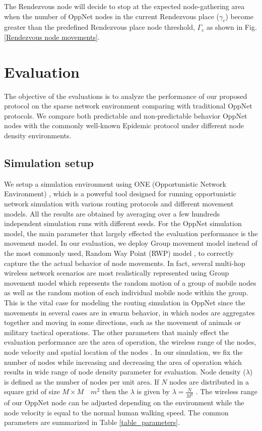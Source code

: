 \documentclass[conference]{IEEEtran}
\begin{document}
The Rendezvous node will decide to stop at the expected node-gathering area when the number of OppNet nodes in the current Rendezvous place ($\gamma_{c}$) become greater than the predefined Rendezvous place node threshold, $\Gamma_{c}$ as shown in Fig. \ref{Rendezvous node movements}.  

\section{Evaluation}
The objective of the evaluations is to analyze the performance of our proposed protocol on the sparse network environment comparing with traditional OppNet protocols.
We compare both predictable and non-predictable behavior OppNet nodes with the commonly well-known Epidemic protocol\cite{Vahdat2000} under different node density environments.

\subsection{Simulation setup}
We setup a simulation environment using ONE (Opportunistic Network Environment) \cite{Keranen2009b}, which is a powerful tool designed for running opportunistic network simulation with various routing protocols and different movement models.
All the results are obtained by averaging over a few hundreds independent simulation runs with different seeds.
For the OppNet simulation model, the main parameter that largely effected the evaluation performance is the movement model.
In our evaluation, we deploy Group movement model instead of the most commonly used, Random Way Point (RWP) model \cite{Batabyal2012}, to correctly capture the the actual behavior of node movements.
In fact, several multi-hop wireless network scenarios are most realistically represented using Group movement model \cite{Blakely2004} which represents the random motion of a group of mobile nodes as well as the random motion of each individual mobile node within the group.
This is the vital case for modeling the routing simulation in OppNet since the movements in several cases are in swarm behavior, in which nodes are aggregates together and moving in some directions, such as the movement of animals or military tactical operations.
The other parameters that mainly effect the evaluation performance are the area of operation, the wireless range of the nodes, node velocity and spatial location of the nodes \cite{Batabyal2012}. 
In our simulation, we fix the number of nodes while increasing and decreasing the area of operation which results in wide range of node density parameter for evaluation.
Node density ($\lambda$) is defined as the number of nodes per unit area. 
If $N$ nodes are distributed in a square grid of size $M \times M \quad{ m }^{ 2 }$ then the $\lambda$ is given by $\lambda =\frac { N }{ { M }^{ 2 } } $ . 
The wireless range of our OppNet node can be adjusted depending on the environment while the node velocity is equal to the normal human walking speed.
The common parameters are summarized in Table \ref{table_parameters}.
\end{document}
